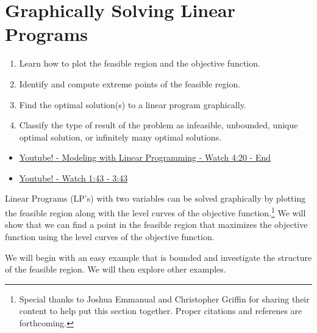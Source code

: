 \chapter{Graphically Solving Linear Programs}
\begin{outcome}
\begin{enumerate}
\item[A.] Learn how to plot the feasible region and the objective function.
\item[B.] Identify and compute extreme points of the feasible region.
\item[C.] Find the optimal solution(s) to a linear program graphically.
\item[D.] Classify the type of result of the problem as infeasible, unbounded, unique optimal solution, or infinitely many optimal solutions.
\end{enumerate}
\end{outcome}
\begin{resource}
\begin{itemize}
\item \href{https://www.youtube.com/watch?v=K7TL5NMlKIk&ab_channel=Dr.TreforBazett}{Youtube! - Modeling with Linear Programming - Watch 4:20 - End}
\item \href{https://www.youtube.com/watch?v=E72DWgKP_1Y&t=1014s&ab_channel=TomS}{Youtube! - Watch 1:43 - 3:43}
\end{itemize}
\end{resource}

Linear Programs (LP's) with two variables can be solved graphically by plotting the feasible region along with the level curves of the objective function.\footnote{Special thanks to Joshua Emmanual and Christopher Griffin for sharing their content to help put this section together. Proper citations and referenes are forthcoming.} We will show that we can find a point in the feasible region that maximizes the objective function using the level curves of the objective function.

We will begin with an easy example that is bounded and investigate the structure of the feasible region.  We will then explore other examples.




